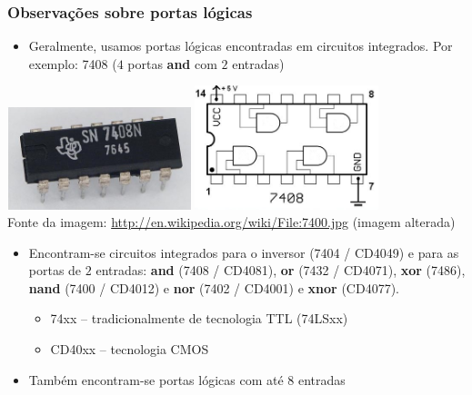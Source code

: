 \documentclass{beamer}
\begin{document}
\begin{frame}
\frametitle{Observações sobre portas lógicas}

{\small
\begin{itemize}

\item Geralmente, usamos portas lógicas encontradas em circuitos integrados. \pause Por exemplo: 7408 ($4$ portas \textbf{and} com $2$ entradas)
\end{itemize}

\hfill \includegraphics[width=0.4\textwidth]{images/7408foto} \hfill \includegraphics[width=0.4\textwidth]{images/7408circ} \hfill \phantom{.}\\ 
{\hfill \color{gray} \tiny Fonte da imagem: \url{http://en.wikipedia.org/wiki/File:7400.jpg} (imagem alterada)}

\pause

\begin{itemize}
\item Encontram-se circuitos integrados para o inversor (7404 / CD4049) e para as portas de $2$ entradas: \textbf{and} (7408 / CD4081), \textbf{or} (7432 / CD4071), \textbf{xor} (7486), \textbf{nand} (7400 / CD4012) e \textbf{nor} (7402 / CD4001) e \textbf{xnor} (CD4077).
\pause
\begin{itemize}
\item 74xx -- tradicionalmente de tecnologia TTL (74LSxx)
\item CD40xx -- tecnologia CMOS
\end{itemize}

\pause

\item Também encontram-se portas lógicas com até $8$ entradas
\end{itemize}
}

\end{frame}
\end{document}
